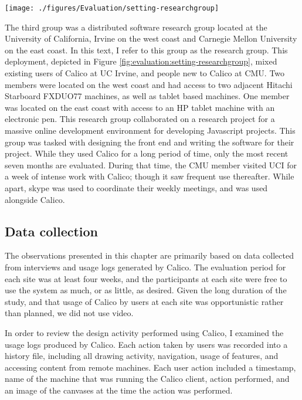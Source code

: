 \documentclass[12pt,fleqn]{ucithesis}
\begin{document}
\begin{figure*}[tbh]
  \centering
  \texttt{[image: ./figures/Evaluation/setting-researchgroup]}
  \caption{The physical setup of the research group.}
  \label{fig:evaluation:setting-researchgroup}
\end{figure*}

The third group was a distributed software research group located at the University of California, Irvine on the west coast and Carnegie Mellon University on the east coast. In this text, I refer to this group as the research group. This deployment, depicted in Figure \ref{fig:evaluation:setting-researchgroup}, mixed existing users of Calico at UC Irvine, and people new to Calico at CMU. Two members were located on the west coast and had access to two adjacent Hitachi Starboard FXDUO77 machines, as well as tablet based machines. One member was located on the east coast with access to an HP tablet machine with an electronic pen. This research group collaborated on a research project for a massive online development environment for developing Javascript projects. This group was tasked with designing the front end and writing the software for their project. While they used Calico for a long period of time, only the most recent seven months are evaluated. During that time, the CMU member visited UCI for a week of intense work with Calico; though it saw frequent use thereafter. While apart, skype was used to coordinate their weekly meetings, and was used alongside Calico.

\subsection{Data collection}

The observations presented in this chapter are primarily based on data collected from interviews and usage logs generated by Calico. The evaluation period for each site was at least four weeks, and the participants at each site were free to use the system as much, or as little, as desired. Given the long duration of the study, and that usage of Calico by users at each site was opportunistic rather than planned, we did not use video.

In order to review the design activity performed using Calico, I examined the usage logs produced by Calico. Each action taken by users was recorded into a history file, including all drawing activity, navigation, usage of features, and accessing content from remote machines. Each user action included a timestamp, name of the machine that was running the Calico client, action performed, and an image of the canvases at the time the action was performed. 
\end{document}
